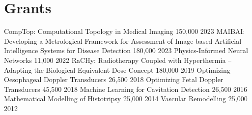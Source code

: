 \documentclass[11pt, a4paper]{awesome-cv}
\begin{document}
\hypertarget{grants}{\section{Grants}\label{grants}}
%
%
\begin{cvhonorsLong}
%
{}%
{CompTop: Computational Topology in Medical Imaging}%
{\texteuro{}150,000}%
{2023}
%
%
{}%
{MAIBAI: Developing a Metrological Framework for Assessment of Image-based Artificial Intelligence Systems for Disease Detection}%
{\texteuro{}180,000}%
{2023}
%
%
{Physics-Informed Neural Networks }%
{\texteuro{}11,000}%
{2022}
%
%
{RaCHy: Radiotherapy Coupled with Hyperthermia -- Adapting the Biological Equivalent Dose Concept}%
{\textsterling{}180,000}%
{2019}
%
%
{Optimizing Oesophageal Doppler Transducers}%
{\textsterling{}26,500}%
{2018}
%
%
{Optimizing Fetal Doppler Transducers}%
{\textsterling{}45,500}%
{2018}
%
%
{Machine Learning for Cavitation Detection}%
{\textsterling{}26,500}%
{2016}
%
%
{Mathematical Modelling of Histotripsy}%
{\textsterling{}25,000}%
{2014}
%
%
{Vascular Remodelling}%
{\textsterling{}25,000}%
{2012}
%
\end{cvhonorsLong}

%
%
%
%
%
\end{document}
